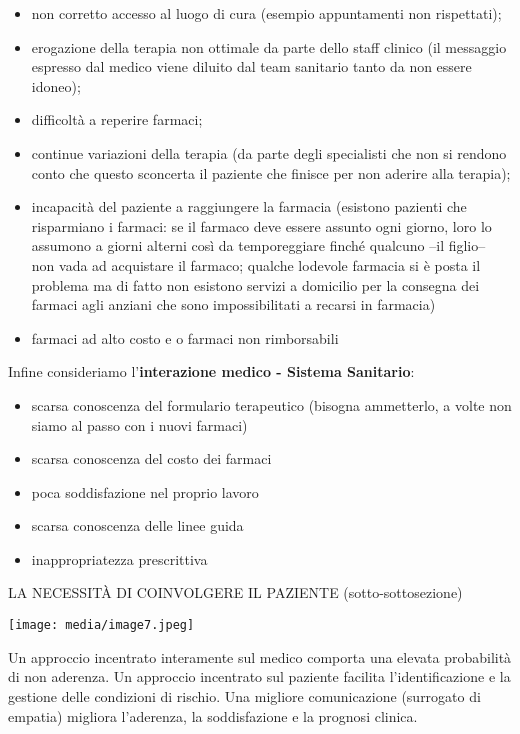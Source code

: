 \documentclass[]{article}
\begin{document}
\begin{itemize}
\item
  non corretto accesso al luogo di cura (esempio appuntamenti non
  rispettati);
\item
  erogazione della terapia non ottimale da parte dello staff clinico (il
  messaggio espresso dal medico viene diluito dal team sanitario tanto
  da non essere idoneo);
\item
  difficoltà a reperire farmaci;
\item
  continue variazioni della terapia (da parte degli specialisti che non
  si rendono conto che questo sconcerta il paziente che finisce per non
  aderire alla terapia);
\item
  incapacità del paziente a raggiungere la farmacia (esistono pazienti
  che risparmiano i farmaci: se il farmaco deve essere assunto ogni
  giorno, loro lo assumono a giorni alterni così da temporeggiare finché
  qualcuno --il figlio-- non vada ad acquistare il farmaco; qualche
  lodevole farmacia si è posta il problema ma di fatto non esistono
  servizi a domicilio per la consegna dei farmaci agli anziani che sono
  impossibilitati a recarsi in farmacia)
\item
  farmaci ad alto costo e o farmaci non rimborsabili
\end{itemize}

Infine consideriamo l'\textbf{interazione medico - Sistema Sanitario}:

\begin{itemize}
\item
  scarsa conoscenza del formulario terapeutico (bisogna ammetterlo, a
  volte non siamo al passo con i nuovi farmaci)
\item
  scarsa conoscenza del costo dei farmaci
\item
  poca soddisfazione nel proprio lavoro
\item
  scarsa conoscenza delle linee guida
\item
  inappropriatezza prescrittiva
\end{itemize}

LA NECESSITÀ DI COINVOLGERE IL PAZIENTE (sotto-sottosezione)

\texttt{[image: media/image7.jpeg]}

Un approccio incentrato interamente sul medico comporta una elevata
probabilità di non aderenza. Un approccio incentrato sul paziente
facilita l'identificazione e la gestione delle condizioni di rischio.
Una migliore comunicazione (surrogato di empatia) migliora l'aderenza,
la soddisfazione e la prognosi clinica.
\end{document}
